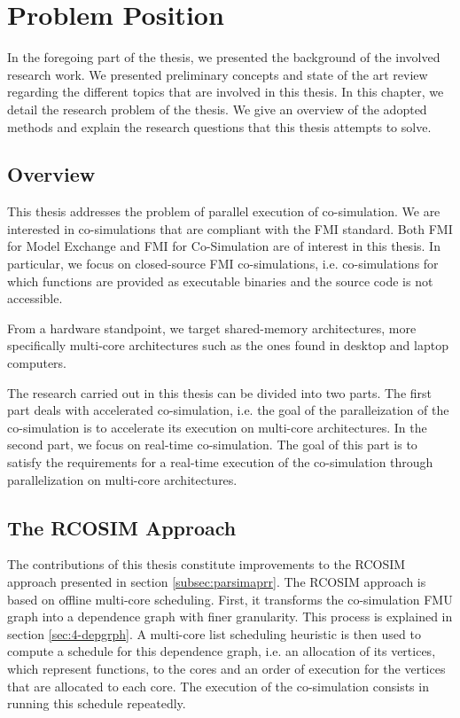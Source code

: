 \chapter{\label{ch:3-state}Problem Position} 

\minitoc

In the foregoing part of the thesis, we presented the background of the involved research work. We presented preliminary concepts and state of the art review regarding the different topics that are involved in this thesis. In this chapter, we detail the research problem of the thesis. We give an overview of the adopted methods and explain the research questions that this thesis attempts to solve.

\section{Overview}

This thesis addresses the problem of parallel execution of co-simulation. We are interested in co-simulations that are compliant with the FMI standard. Both FMI for Model Exchange and FMI for Co-Simulation are of interest in this thesis. In particular, we focus on closed-source FMI co-simulations, i.e. co-simulations for which functions are provided as executable binaries and the source code is not accessible.

From a hardware standpoint, we target shared-memory architectures, more specifically multi-core architectures such as the ones found in desktop and laptop computers.

The research carried out in this thesis can be divided into two parts. The first part deals with accelerated co-simulation, i.e. the goal of the paralleization of the co-simulation is to accelerate its execution on multi-core architectures. In the second part, we focus on real-time co-simulation. The goal of this part is to satisfy the requirements for a real-time execution of the co-simulation through parallelization on multi-core architectures.

\section{The RCOSIM Approach}

The contributions of this thesis constitute improvements to the RCOSIM approach presented in section \ref{subsec:parsimaprr}. The RCOSIM approach is based on offline multi-core scheduling. First, it transforms the co-simulation FMU graph into a dependence graph with finer granularity. This process is explained in section \ref{sec:4-depgrph}. A multi-core list scheduling heuristic is then used to compute a schedule for this dependence graph, i.e. an allocation of its vertices, which represent functions, to the cores and an order of execution for the vertices that are allocated to each core. The execution of the co-simulation consists in running this schedule repeatedly.

